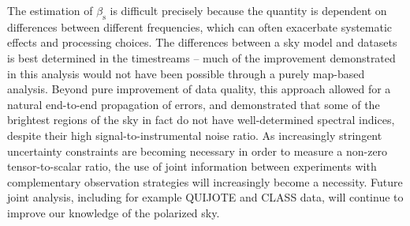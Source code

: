 \documentclass[twocolumn]{../../common/aa}
\begin{document}
The estimation of $\beta_\mathrm s$ is difficult precisely because the quantity is dependent on differences between different frequencies, which can often exacerbate systematic effects and processing choices. The differences between a sky model and datasets is best determined in the timestreams -- much of the improvement demonstrated in this analysis would not have been possible through a purely map-based analysis. Beyond pure improvement of data quality, this approach allowed for a natural end-to-end propagation of errors, and demonstrated that some of the brightest regions of the sky in fact do not have well-determined spectral indices, despite their high signal-to-instrumental noise ratio. As increasingly stringent uncertainty constraints are becoming necessary in order to measure a non-zero tensor-to-scalar ratio, the use of joint information between experiments with complementary observation strategies will increasingly become a necessity. Future joint analysis, including for example QUIJOTE and CLASS data, will continue to improve our knowledge of the polarized sky.







\end{document}
